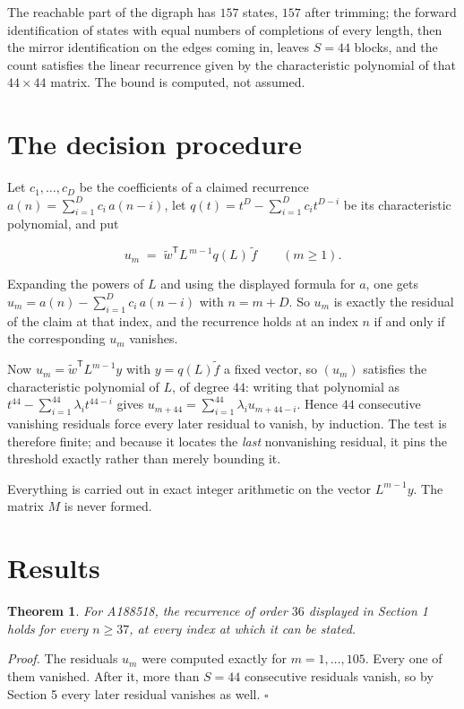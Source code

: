 \documentclass[11pt]{article}
\newtheorem{theorem}{Theorem}
\theoremstyle{definition}
\begin{document}
The reachable part of the digraph has $157$ states, $157$ after trimming; the forward identification of states with equal numbers of completions of every length, then the mirror identification on the edges coming in, leaves $S = 44$ blocks, and the count satisfies the linear recurrence given by the characteristic polynomial of that $44\times44$ matrix. The bound is computed, not assumed.

\section{The decision procedure}

Let $c_1,\dots,c_D$ be the coefficients of a claimed recurrence $a(n) = \sum_{i=1}^{D} c_i\,a(n-i)$, let $q(t) = t^{D} - \sum_{i=1}^{D} c_i t^{D-i}$ be its characteristic polynomial, and put

\[u_m \;=\; \tilde w^{\mathsf T} L^{\,m-1} q(L)\,\tilde f \qquad (m \ge 1).\]

Expanding the powers of $L$ and using the displayed formula for $a$, one gets $u_m = a(n) - \sum_{i=1}^{D} c_i\,a(n-i)$ with $n = m + D$. So $u_m$ is exactly the residual of the claim at that index, and the recurrence holds at an index $n$ if and only if the corresponding $u_m$ vanishes.

Now $u_m = \tilde w^{\mathsf T} L^{m-1} y$ with $y = q(L)\tilde f$ a fixed vector, so $(u_m)$ satisfies the characteristic polynomial of $L$, of degree $44$: writing that polynomial as $t^{44} - \sum_{i=1}^{44} \lambda_i t^{44-i}$ gives $u_{m+44} = \sum_{i=1}^{44} \lambda_i u_{m+44-i}$. Hence $44$ consecutive vanishing residuals force every later residual to vanish, by induction. The test is therefore finite; and because it locates the {\itshape last} nonvanishing residual, it pins the threshold exactly rather than merely bounding it.

Everything is carried out in exact integer arithmetic on the vector $L^{m-1}y$. The matrix $M$ is never formed.

\section{Results}

\begin{theorem} For A188518, the recurrence of order $36$ displayed in Section 1 holds for every $n \ge 37$, at every index at which it can be stated.\end{theorem}

{\itshape Proof.} The residuals $u_m$ were computed exactly for $m = 1,\dots,105$. Every one of them vanished. After it, more than $S = 44$ consecutive residuals vanish, so by Section 5 every later residual vanishes as well. $\square$
\end{document}
